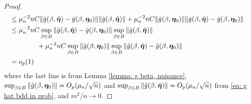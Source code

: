 \documentclass[12pt]{article}
\begin{document}
{\begin{proof}
\begin{align*}
   &\leq  \mu_n^{-2}n C \|\hat g(\beta, \hat{\bm \eta})-\hat g(\beta, \bm \eta_0) \| \|\hat g(\beta, \hat{\bm \eta}) \|+\mu_n^{-2}n C \| \hat g(\beta, \bm \eta_0)\| \| \hat g(\beta, \hat{\bm \eta}) - \hat g(\beta, \bm \eta_0) \|\\
   &\leq \mu_n^{-2} n  C\sup_{\beta\in B} \|\hat g(\beta, \hat{\bm \eta})-\hat g(\beta, \bm \eta_0) \| \sup_{\beta\in B} \|\hat g(\beta, \hat{\bm \eta}) \| \\
   &\qquad \qquad + \mu_n^{-2} n C\sup_{\beta\in B}\| \hat g(\beta, \bm \eta_0)\| \sup_{\beta\in B} \| \hat g(\beta, \hat{\bm \eta}) -\hat  g(\beta, \bm \eta_0) \| \\
   & = o_p(1)
\end{align*}
where the last line is from Lemma \ref{lemma: g beta, nuisance},  $\sup_{\beta\in B}\| \hat g(\beta, \bm \eta_0)\|= O_p(\mu_n/\sqrt{n})$ and $\sup_{\beta\in B}\| \hat g(\beta, \hat{\bm \eta})\|= O_p(\mu_n/\sqrt{n})$ from \eqref{eq: g hat bdd in prob}, and $m^2/n\rightarrow 0$. 


\end{proof}}
\end{document}

